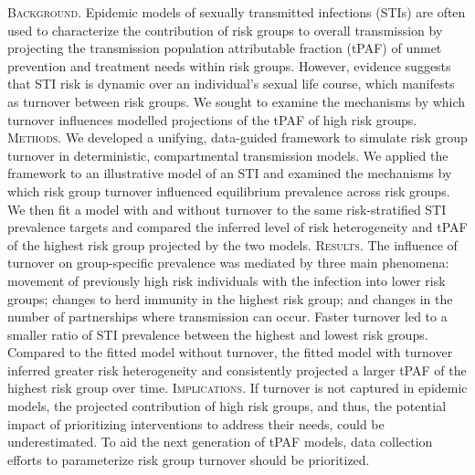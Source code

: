 \textsc{Background.}
Epidemic models of sexually transmitted infections (STIs)
are often used to characterize
the contribution of risk groups
to overall transmission
by projecting the transmission population attributable fraction (tPAF)
of unmet prevention and treatment needs within risk groups.
However, evidence suggests that
STI risk is dynamic over an individual's sexual life course,
which manifests as turnover between risk groups.
We sought to examine the mechanisms by which turnover
influences modelled projections of the tPAF of high risk groups.
\textsc{Methods.}
We developed a unifying, data-guided framework to simulate risk group turnover
in deterministic, compartmental transmission models.
We applied the framework to an illustrative model of an STI
and examined the mechanisms by which
risk group turnover influenced equilibrium prevalence across risk groups.
We then fit a model with and without turnover to
the same risk-stratified STI prevalence targets
and compared the inferred level of risk heterogeneity and
tPAF of the highest risk group projected by the two models.
\textsc{Results.}
The influence of turnover on group-specific prevalence
was mediated by three main phenomena:
movement of previously high risk individuals with the infection into lower risk groups;
changes to herd immunity in the highest risk group; and
changes in the number of partnerships where transmission can occur.
Faster turnover led to
a smaller ratio of STI prevalence between the highest and lowest risk groups.
Compared to the fitted model without turnover,
the fitted model with turnover inferred greater risk heterogeneity
and consistently projected a larger tPAF of the highest risk group over time.
\textsc{Implications.}
If turnover is not captured in epidemic models,
the projected contribution of high risk groups, and thus,
the potential impact of prioritizing interventions to address their needs, could be underestimated.
To aid the next generation of tPAF models,
data collection efforts to parameterize risk group turnover should be prioritized.